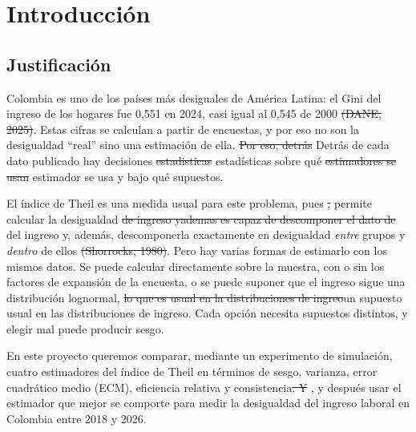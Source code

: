 \documentclass[12pt,letterpaper]{article}
\providecommand{\DIFaddtex}[1]{{\protect\color{BLUE}#1}} %
\providecommand{\DIFdeltex}[1]{{\protect\color{RED}\sout{#1}}} %
\providecommand{\DIFaddtex}[1]{\texorpdfstring{\DIFaddtex{#1}}{#1}} %
\providecommand{\DIFdeltex}[1]{\texorpdfstring{\DIFdeltex{#1}}{}} %
\providecommand{\DIFaddbegin}{}\providecommand{\DIFaddend}{} %
\providecommand{\DIFdelbegin}{}\providecommand{\DIFdelend}{} %
\providecommand{\DIFadd}[1]{\texorpdfstring{\DIFaddtex{#1}}{#1}} %
\providecommand{\DIFdel}[1]{\texorpdfstring{\DIFdeltex{#1}}{}} %
\begin{document}

\section{Introducción}

\subsection{Justificación}

Colombia es uno de los países más desiguales de América Latina: el Gini del ingreso de los hogares fue 0,551 en 2024, casi igual al 0,545 de 2000 \DIFdelbegin \DIFdel{(DANE, 2025)}\DIFdelend \DIFaddbegin \parencite{dane2025pobreza}\DIFaddend . Estas cifras se calculan a partir de encuestas, y por eso no son la desigualdad ``real'' sino una estimación de ella. \DIFdelbegin \DIFdel{Por eso, detrás }\DIFdelend \DIFaddbegin \DIFadd{Detrás }\DIFaddend de cada dato publicado hay decisiones \DIFdelbegin \DIFdel{estadisticas }\DIFdelend \DIFaddbegin \DIFadd{estadísticas }\DIFaddend sobre qué \DIFdelbegin \DIFdel{estimadores se usan }\DIFdelend \DIFaddbegin \DIFadd{estimador se usa }\DIFaddend y bajo qué supuestos.

El índice de Theil es una medida usual para este problema, pues \DIFdelbegin \DIFdel{, }\DIFdelend permite calcular la desigualdad \DIFdelbegin \DIFdel{de ingreso yademas es capaz de  descomponer el dato de }\DIFdelend \DIFaddbegin \DIFadd{del ingreso y, además, descomponerla exactamente en }\DIFaddend desigualdad \emph{entre} grupos y \emph{dentro} de ellos \DIFdelbegin \DIFdel{(Shorrocks, 1980)}\DIFdelend \DIFaddbegin \parencite{shorrocks1980class}\DIFaddend . Pero hay varias formas de estimarlo con los mismos datos. Se puede calcular directamente sobre la muestra, con o sin los factores de expansión de la encuesta, o se puede suponer que el ingreso sigue una distribución lognormal, \DIFdelbegin \DIFdel{lo que es usual en la distribuciones de ingreo}\DIFdelend \DIFaddbegin \DIFadd{un supuesto usual en las distribuciones de ingreso}\DIFaddend . Cada opción necesita supuestos distintos, y elegir mal puede producir sesgo.

En este proyecto queremos comparar, mediante un experimento de simulación, cuatro estimadores del índice de Theil en términos de sesgo, varianza, error cuadrático medio (ECM), eficiencia relativa y consistencia\DIFdelbegin \DIFdel{. Y }\DIFdelend \DIFaddbegin \DIFadd{, y }\DIFaddend después usar el estimador que mejor se comporte para medir la desigualdad del ingreso laboral en Colombia entre 2018 y 2026.
\end{document}
